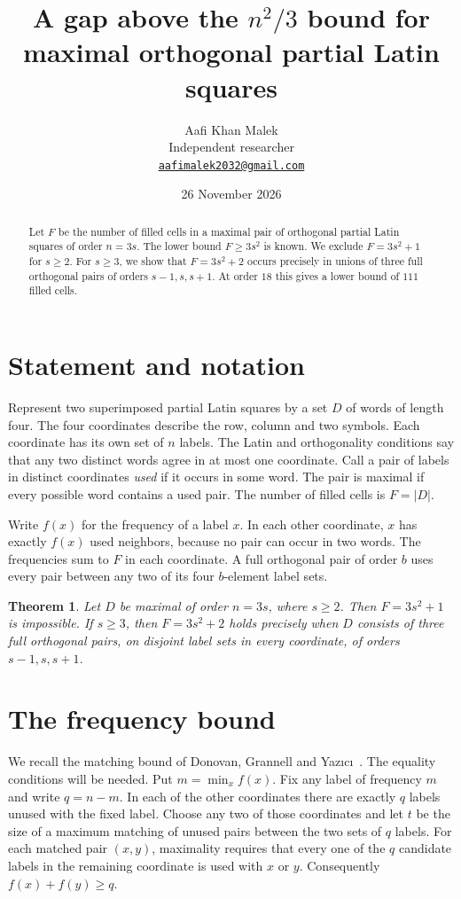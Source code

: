 \documentclass[11pt]{article}
\title{A gap above the \(n^2/3\) bound for maximal orthogonal partial Latin squares}
\author{Aafi Khan Malek\\
\small Independent researcher\\
\small\href{mailto:aafimalek2032@gmail.com}{\texttt{aafimalek2032@gmail.com}}}
\date{26 November 2026}
\newtheorem{theorem}{Theorem}
\begin{document}
\maketitle

\begin{abstract}
Let \(F\) be the number of filled cells in a maximal pair of orthogonal
partial Latin squares of order \(n=3s\). The lower bound \(F\ge 3s^2\)
is known. We exclude \(F=3s^2+1\) for \(s\ge2\). For \(s\ge3\), we
show that \(F=3s^2+2\) occurs precisely in unions of three full
orthogonal pairs of orders \(s-1,s,s+1\). At order \(18\) this gives
a lower bound of \(111\) filled cells.
\end{abstract}

\section{Statement and notation}

Represent two superimposed partial Latin squares by a set \(D\) of
words of length four. The four coordinates describe the row, column
and two symbols. Each coordinate has its own set of \(n\) labels.
The Latin and orthogonality conditions say that any two distinct words
agree in at most one coordinate. Call a pair of labels in distinct
coordinates \emph{used} if it occurs in some word. The pair is maximal
if every possible word contains a used pair. The number of filled
cells is \(F=|D|\).

Write \(f(x)\) for the frequency of a label \(x\). In each other
coordinate, \(x\) has exactly \(f(x)\) used neighbors, because no pair
can occur in two words. The frequencies sum to \(F\) in each coordinate.
A full orthogonal pair of order \(b\) uses every pair between any two
of its four \(b\)-element label sets.

\begin{theorem}\label{thm:main}
Let \(D\) be maximal of order \(n=3s\), where \(s\ge2\).
Then \(F=3s^2+1\) is impossible. If \(s\ge3\), then \(F=3s^2+2\)
holds precisely when \(D\) consists of three full orthogonal pairs,
on disjoint label sets in every coordinate, of orders \(s-1,s,s+1\).
\end{theorem}

\section{The frequency bound}

We recall the matching bound of Donovan, Grannell and
Yaz\i c\i~\cite[Theorem 2.1 and Lemma 2.2]{feb}. The equality conditions
will be needed. Put \(m=\min_x f(x)\). Fix any label of frequency \(m\)
and write \(q=n-m\). In each of the other coordinates there are exactly
\(q\) labels unused with the fixed label. Choose any two of those
coordinates and let \(t\) be the size of a maximum matching of unused
pairs between the two sets of \(q\) labels. For each matched pair
\((x,y)\), maximality requires that every one of the \(q\) candidate
labels in the remaining coordinate is used with \(x\) or \(y\).
Consequently \(f(x)+f(y)\ge q\).
\end{document}
